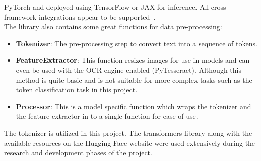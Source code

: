 PyTorch and deployed using TensorFlow or JAX for inference. All cross framework integrations appear to be supported~\autocite{Transformers}.\\
The library also contains some great functions for data pre-processing:
\begin{itemize}
	\item \textbf{Tokenizer}: The pre-processing step to convert text into a sequence of tokens.
	\item \textbf{FeatureExtractor}: This function resizes images for use in models and can even be used with the OCR engine enabled (PyTesseract).
	      Although this method is quite basic and is not suitable for more complex tasks such as the token classification task in this project.
	\item \textbf{Processor}: This is a model specific function which wraps the tokenizer and the feature extractor in to a single function for
	      ease of use.
\end{itemize}
The tokenizer is utilized in this project.
The transformers library along with the available resources on the Hugging Face website were used extensively during the research and development
phases of the project.